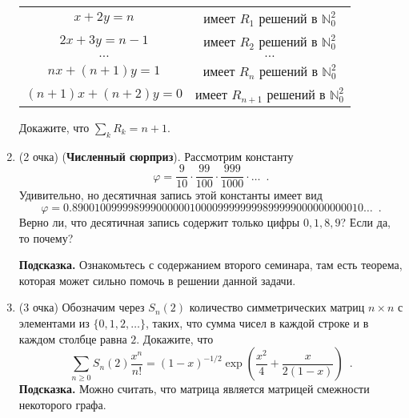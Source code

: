 \documentclass[a5paper]{article}
\theoremstyle{definition}
\begin{document}
\begin{enumerate}
\begin{tabular}{cc}
  $x + 2y = n$ & имеет $R_1$ решений в $\mathbb N_0^2$ \\
  $2x + 3y = n-1$ & имеет $R_2$ решений в $\mathbb N_0^2$ \\
  $\hdots$ & $\hdots$ \\
  $nx + (n+1)y = 1$ & имеет $R_n$ решений в $\mathbb N_0^2$ \\
  $(n+1)x + (n+2)y = 0$ & имеет $R_{n+1}$ решений в $\mathbb N_0^2$ \\
\end{tabular}

Докажите, что $\sum_{k} R_k = n+1$.
\item(2 очка) (\textbf{Численный сюрприз}). Рассмотрим константу
\[
	\varphi = \dfrac{9}{10} \cdot \dfrac{99}{100} \cdot
	\dfrac{999}{1000} \cdot \ldots
	\enspace .
\]
Удивительно, но десятичная запись этой константы имеет вид
\[
	\varphi = 0.8900100999989990000001000099999999899999000000000010 \ldots
	 \enspace .
\]
Верно ли, что десятичная запись содержит только цифры \( 0, 1, 8, 9 \)? Если 
да, то почему?

\textbf{Подсказка.} Ознакомьтесь с содержанием второго семинара, там есть теорема, которая может сильно помочь в решении данной задачи.
\item(3 очка) Обозначим через \( S_n(2) \) количество симметрических матриц \( 
n \times n \) 
с 
элементами из \( \{ 0,1,2,\ldots \} \), таких, что сумма чисел в каждой строке 
и в каждом столбце равна \( 2 \). Докажите, что
\[
	\sum_{n \geq 0} S_n(2) \dfrac{x^n}{n!} = (1-x)^{-1/2} \exp \left(
		\dfrac{x^2}{4} + \dfrac{x}{2(1-x)}
	\right) \enspace .
\]
\textbf{Подсказка.} Можно считать, что матрица является матрицей смежности некоторого 
графа.

\end{enumerate}

\footnotesize


    
\end{document}
